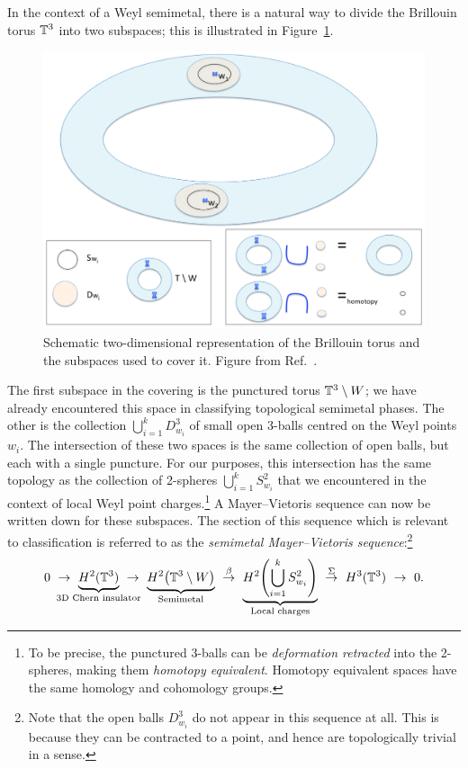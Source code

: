 In the context of a Weyl semimetal, there is a natural way to divide the Brillouin torus $\mathbb{T}^3$ into two subspaces; this is illustrated in Figure~\ref{fig:semimetal-MV}.
\begin{figure}[htb!]
	\centering
	\includegraphics[width=.8\linewidth]{Images/semimetal-MV}
	\caption{
		Schematic two-dimensional representation of the Brillouin torus and the subspaces used to cover it.
		Figure from Ref.~\cite{Thiang_equivariant}.}
	\label{fig:semimetal-MV}
\end{figure}
The first subspace in the covering is the punctured torus $\mathbb{T}^3\setminus W$; we have already encountered this space in classifying topological semimetal phases. The other is the collection $\bigcup_{i=1}^k D_{w_i}^3$ of small open 3-balls centred on the Weyl points $w_i$. The intersection of these two spaces is the same collection of open balls, but each with a single puncture. For our purposes, this intersection has the same topology as the collection of 2-spheres $\bigcup_{i=1}^k S_{w_i}^2$ that we encountered in the context of local Weyl point charges.\footnote{
	To be precise, the punctured 3-balls can be \emph{deformation retracted} into the 2-spheres, making them \emph{homotopy equivalent}. Homotopy equivalent spaces have the same homology and cohomology groups.}
A Mayer--Vietoris sequence can now be written down for these subspaces. The section of this sequence which is relevant to classification is referred to as the \emph{semimetal Mayer--Vietoris sequence}:\footnote{
	Note that the open balls $D_{w_i}^3$ do not appear in this sequence at all. This is because they can be contracted to a point, and hence are topologically trivial in a sense.}
\begin{equation}\label{eq:semimetal-MV-symbolic}
	0\ \to\ \underbrace{H^2(\T^3)}_{\mathclap{\text{3D Chern insulator}}}\ \to\ 
	\underbrace{H^2\big(\T^3\setminus W\big)}_{\text{Semimetal}}\ \overset{\beta}{\to}\ \underbrace{H^2\!\left(\bigcup_{i=1}^k S_{w_i}^2\right)}_{\text{Local charges}}\ \overset{\Sigma}{\to}\ H^3(\T^3)\ \to\ 0.
\end{equation}
